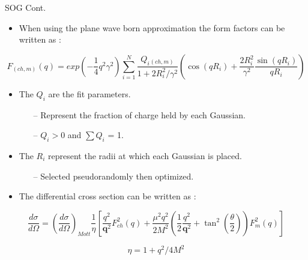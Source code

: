 \documentclass[10pt]{beamer}
\begin{document}
\begin{frame}[fragile]{SOG Cont.}

	\begin{itemize}
		\item When using the \alert{plane wave born approximation} the form factors can be written as \cite{Article:SOG}: 
	\end{itemize}
	
	\vspace{-4mm}
	\begin{equation} \label{eq:sog_ffs}
		F_{(ch,m)}(q) = exp \left(-\frac{1}{4} q^2 \gamma^2 \right) \sum^{N}_{i=1} \frac{Q_i{_{(ch,m)}}}{1+2R^2_i/\gamma^2} \left( \cos(qR_i) + \frac{2R^2_i}{\gamma^2} \frac{\sin(qR_i)}{qR_i} \right)
	\end{equation}
	
	\pause
	\vspace{-3mm}
	\begin{itemize}
		\item The $Q_i$ are the fit parameters.
			\begin{itemize}
				\item[--] Represent the \alert{fraction of charge held by each Gaussian}.
				\item[--] $Q_i>$0 and $\sum Q_i$ = 1.
			\end{itemize}
		\pause
		\item The $R_i$ represent the \alert{radii at which each Gaussian is placed}.
			\begin{itemize}
				\item[--] Selected pseudorandomly then optimized.
			\end{itemize}
		\pause
		\item The differential cross section can be written as \cite{Article:Amroun}: 
	\end{itemize}
	
	\vspace{-3mm}
	\begin{equation} \label{eq:xs}
		\frac{d\sigma}{d\Omega} = \left( \frac{d\sigma}{d\Omega} \right)_{Mott} \frac{1}{\eta} \left[ \frac{q^2}{\boldsymbol{q}^2}F_{ch}^2(q) + \frac{\mu^2q^2}{2M^2} \left( \frac{1}{2} \frac{q^2}{\boldsymbol{q}^2} + \tan^2 \left( \frac{\theta}{2} \right) \right)F_{m}^2(q) \right]
	\end{equation}
	
	\vspace{-4mm}
	\begin{equation}
		\eta = 1 + q^2/4M^2
	\end{equation}

\end{frame}
\end{document}
